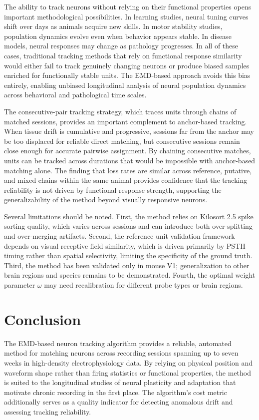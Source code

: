 \documentclass[12pt]{article}
\begin{document}
The ability to track neurons without relying on their functional properties opens important methodological possibilities. In learning studies, neural tuning curves shift over days as animals acquire new skills. In motor stability studies, population dynamics evolve even when behavior appears stable. In disease models, neural responses may change as pathology progresses. In all of these cases, traditional tracking methods that rely on functional response similarity would either fail to track genuinely changing neurons or produce biased samples enriched for functionally stable units. The EMD-based approach avoids this bias entirely, enabling unbiased longitudinal analysis of neural population dynamics across behavioral and pathological time scales.

The consecutive-pair tracking strategy, which traces units through chains of matched sessions, provides an important complement to anchor-based tracking. When tissue drift is cumulative and progressive, sessions far from the anchor may be too displaced for reliable direct matching, but consecutive sessions remain close enough for accurate pairwise assignment. By chaining consecutive matches, units can be tracked across durations that would be impossible with anchor-based matching alone. The finding that loss rates are similar across reference, putative, and mixed chains within the same animal provides confidence that the tracking reliability is not driven by functional response strength, supporting the generalizability of the method beyond visually responsive neurons.

Several limitations should be noted. First, the method relies on Kilosort 2.5 spike sorting quality, which varies across sessions and can introduce both over-splitting and over-merging artifacts. Second, the reference unit validation framework depends on visual receptive field similarity, which is driven primarily by PSTH timing rather than spatial selectivity, limiting the specificity of the ground truth. Third, the method has been validated only in mouse V1; generalization to other brain regions and species remains to be demonstrated. Fourth, the optimal weight parameter $\omega$ may need recalibration for different probe types or brain regions.

\section{Conclusion}

The EMD-based neuron tracking algorithm provides a reliable, automated method for matching neurons across recording sessions spanning up to seven weeks in high-density electrophysiology data. By relying on physical position and waveform shape rather than firing statistics or functional properties, the method is suited to the longitudinal studies of neural plasticity and adaptation that motivate chronic recording in the first place. The algorithm's cost metric additionally serves as a quality indicator for detecting anomalous drift and assessing tracking reliability.



\end{document}
